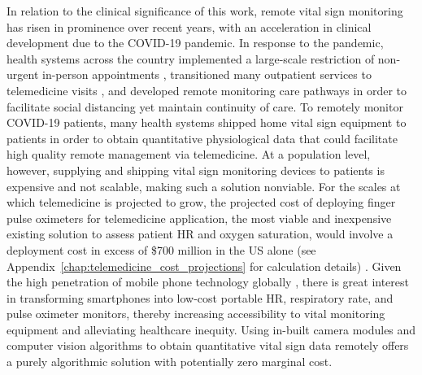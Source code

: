 In relation to the clinical significance of this work, remote vital sign monitoring has risen in prominence over recent years, with an acceleration in clinical development due to the COVID-19 pandemic. In response to the pandemic, health systems across the country implemented a large-scale restriction of non-urgent in-person appointments \cite{jm_virtual_2020}, transitioned many outpatient services to telemedicine visits \cite{connolly_rapid_2020}, and developed remote monitoring care pathways \cite{annis_rapid_2020} in order to facilitate social distancing yet maintain continuity of care. To remotely monitor COVID-19 patients, many health systems shipped home vital sign equipment to patients in order to obtain quantitative physiological data that could facilitate high quality remote management via telemedicine. At a population level, however, supplying and shipping vital sign monitoring devices to patients is expensive and not scalable, making such a solution nonviable. For the scales at which telemedicine is projected to grow, the projected cost of deploying finger pulse oximeters for telemedicine application, the most viable and inexpensive existing solution to assess patient HR and oxygen saturation, would involve a deployment cost in excess of \$700 million in the US alone (see Appendix~\ref{chap:telemedicine_cost_projections} for calculation details) \cite{polaris_us_2020}. Given the high penetration of mobile phone technology globally \cite{pew_demographics_2019}, there is great interest in transforming smartphones into low-cost portable HR, respiratory rate, and pulse oximeter monitors, thereby increasing accessibility to vital monitoring equipment and alleviating healthcare inequity. Using in-built camera modules and computer vision algorithms to obtain quantitative vital sign data remotely offers a purely algorithmic solution with potentially zero marginal cost. 


